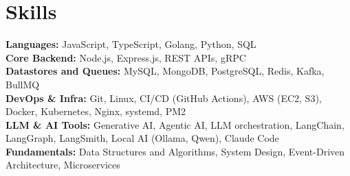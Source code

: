 \documentclass[]{resume-openfont}
\newcommand{\resumeHeading}[4]{\runsubsection{\uppercase{#1}}\descript{ | #2}\hfill\location{#3 | #4}\fakeNewLine}
\begin{document}
\sectionsep



\section{Skills}
\begin{skillList}
    \textbf{Languages:} JavaScript, TypeScript, Golang, Python, SQL \\
    \textbf{Core Backend:} Node.js, Express.js, REST APIs, gRPC \\
    \textbf{Datastores and Queues:} MySQL, MongoDB, PostgreSQL, Redis, Kafka, BullMQ \\
    \textbf{DevOps \& Infra:} Git, Linux, CI/CD (GitHub Actions), AWS (EC2, S3), Docker, Kubernetes, Nginx, systemd, PM2 \\
    \textbf{LLM \& AI Tools:} Generative AI, Agentic AI, LLM orchestration, LangChain, LangGraph, LangSmith, Local AI (Ollama, Qwen), Claude Code \\
    \textbf{Fundamentals:} Data Structures and Algorithms, System Design, Event-Driven Architecture, Microservices
\end{skillList}
\end{document}

